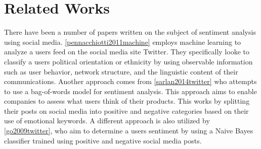 \section{Related Works}
There have been a number of papers written on the subject of sentiment analysis
using social media. \autoref{pennacchiotti2011machine} employs machine learning
to analyze a users feed on the social media site Twitter. They specifically
looke to classify a users political orientation or ethnicity by using observable
information such as user behavior, network structure, and the linguistic content
of their communications. Another approach comes from \autoref{sarlan2014twitter}
who attempts to use a bag-of-words model for sentiment analysis. This approach
aims to enable companies to assess what users think of their products. This
works by splitting their posts on social media into positive and negative
categories based on their use of emotional keywords. A different approach is
also utilized by \autoref{go2009twitter}, who aim to determine a users sentiment
by using a Naive Bayes classifier trained using positive and negative social
media posts.